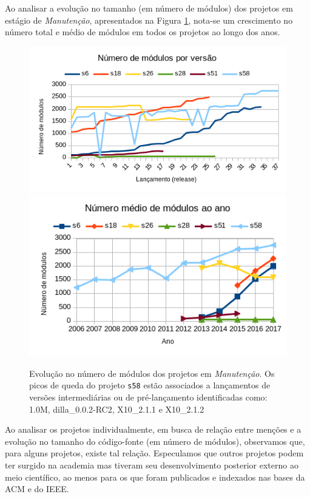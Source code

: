 Ao analisar a evolução no tamanho (em número de módulos) 
dos projetos em estágio de {\it Manutenção}, apresentados na Figura \ref{modules-evolution-servicing},
nota-se um crescimento no número total e médio de módulos
em todos os projetos ao longo dos anos.

\begin{figure}[ht]
  \center
  \includegraphics[scale=0.6]{imagens/modules-evolution-servicing.png}
  \includegraphics[scale=0.6]{imagens/modules-evolution-average.png}
  \caption{Evolução no número de módulos dos projetos em \textit{Manutenção}.
           Os picos de queda do projeto \texttt{s58} estão associados a lançamentos
           de versões intermediárias ou de pré-lançamento identificadas como:
           1.0M, dilla\_0.0.2-RC2, X10\_2.1.1 e X10\_2.1.2}
  \label{modules-evolution-servicing}
\end{figure}

Ao analisar os projetos individualmente, em busca de relação entre
menções e a evolução no tamanho do código-fonte (em número de módulos), 
observamos que, para alguns projetos, existe tal relação.
Especulamos que outros projetos podem ter surgido na academia mas 
tiveram seu desenvolvimento posterior externo ao meio científico, 
ao menos para os que foram publicados e indexados nas bases da ACM e do IEEE.

